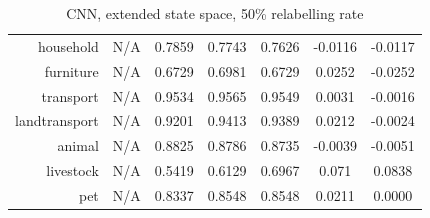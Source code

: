 \documentclass[11pt,a4paper]{article}
\begin{document}
\begin{table}[htbp]
\begin{tabular}{r|c|c|c|c|c|c}
household     & N/A    & 0.7859 & 0.7743 & 0.7626 & -0.0116 & -0.0117\\
furniture     & N/A    & 0.6729 & 0.6981 & 0.6729 & 0.0252 & -0.0252\\
transport     & N/A    & 0.9534 & 0.9565 & 0.9549 & 0.0031 & -0.0016\\
landtransport & N/A    & 0.9201 & 0.9413 & 0.9389 & 0.0212 & -0.0024\\
animal        & N/A    & 0.8825 & 0.8786 & 0.8735 & -0.0039 & -0.0051\\
livestock     & N/A    & 0.5419 & 0.6129 & 0.6967 & 0.071 & 0.0838\\
pet           & N/A    & 0.8337 & 0.8548 & 0.8548 & 0.0211 & 0.0000
\end{tabular}
\caption{CNN, extended state space, 50\% relabelling rate}
\label{tab:cnn50acc}
\end{table}
\end{document}
